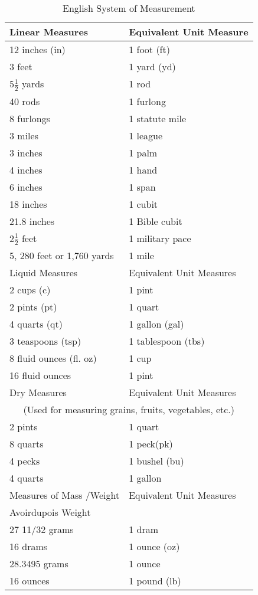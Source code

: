\begin{table}
\centering
\caption{English System of Measurement}
\begin{tabular}{ll}
\hline
\hline
Linear Measures & Equivalent Unit Measure\\
\hline \hline
12 inches (in) & 1 foot (ft)\\
3 feet & 1 yard (yd)\\
$5\frac{1}{2}$ yards & 1 rod\\
40 rods & 1 furlong\\
8 furlongs & 1 statute mile\\
3 miles & 1 league\\
3 inches & 1 palm\\
4 inches & 1 hand\\
6 inches & 1 span\\
18 inches & 1 cubit\\
21.8 inches & 1 Bible cubit\\
$2\frac{1}{2}$ feet &1 military pace\\
5, 280 feet or 1,760 yards & 1 mile\\
\hline
\hline
Liquid Measures & Equivalent Unit Measures\\
\hline \hline
2 cups (c) & 1 pint\\
2 pints (pt) & 1 quart\\
4 quarts (qt) & 1 gallon (gal)\\
3 teaspoons (tsp) & 1 tablespoon (tbs)\\
8 fluid ounces (fl. oz) & 1 cup\\
16 fluid ounces & 1 pint\\
\hline
\hline
Dry Measures & Equivalent Unit Measures\\
\hline \hline
\multicolumn{2}{c}{(Used for measuring grains, fruits, vegetables, etc.)}\\
2 pints & 1 quart\\
8 quarts & 1 peck(pk)\\
4 pecks & 1 bushel (bu)\\
4 quarts & 1 gallon\\
\hline
\hline
Measures of Mass /Weight & Equivalent Unit Measures\\
\hline \hline
Avoirdupois Weight & \\
27 11/32 grams & 1 dram\\
16 drams &1 ounce (oz)\\
28.3495 grams &1 ounce\\
16 ounces &1 pound (lb)\\

\end{tabular}
\end{table}
